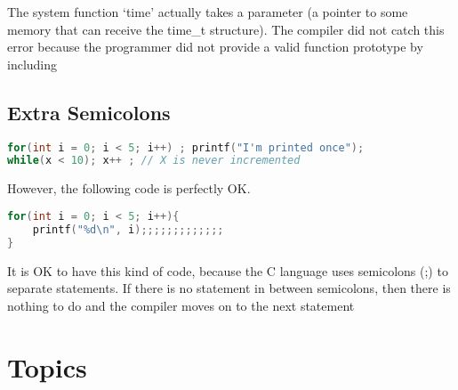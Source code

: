 The system function `time' actually takes a parameter (a pointer to some
memory that can receive the time\_t structure). The compiler did not
catch this error because the programmer did not provide a valid function
prototype by including 

\subsection{Extra Semicolons}\label{extra-semicolons}

\begin{lstlisting}[language=C]
for(int i = 0; i < 5; i++) ; printf("I'm printed once");
while(x < 10); x++ ; // X is never incremented
\end{lstlisting}

However, the following code is perfectly OK.

\begin{lstlisting}[language=C]
for(int i = 0; i < 5; i++){
    printf("%d\n", i);;;;;;;;;;;;;
}
\end{lstlisting}

It is OK to have this kind of code, because the C language uses
semicolons (;) to separate statements. If there is no statement in
between semicolons, then there is nothing to do and the compiler moves
on to the next statement

\section{Topics}

